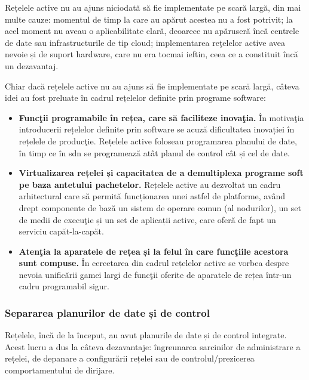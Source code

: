 Rețelele active nu au ajuns niciodată să fie implementate pe scară largă, din mai multe cauze: momentul de timp la care au apărut acestea nu a fost potrivit; la acel moment nu aveau o aplicabilitate clară, deoarece nu apăruseră încă centrele de date sau infrastructurile de tip cloud; implementarea reţelelor active avea nevoie și de suport hardware, care nu era tocmai ieftin, ceea ce a constituit încă un dezavantaj.

Chiar dacă rețelele active nu au ajuns să fie implementate pe scară largă, câteva idei au fost preluate în cadrul rețelelor definite prin programe software:
\begin{itemize}
\item \textbf{Funcţii programabile în rețea, care să faciliteze inovaţia.} În motivaţia introducerii rețelelor definite prin software se acuză dificultatea inovației în rețelele de producţie. Rețelele active foloseau programarea planului de date, în timp ce în \gls{sdn} se programează atât planul de control cât și cel de date.
\item \textbf{Virtualizarea rețelei și capacitatea de a demultiplexa programe soft pe baza antetului pachetelor.} Rețelele active au dezvoltat un cadru arhitectural care să permită funcționarea unei astfel de platforme, având drept componente de bază un sistem de operare comun (al nodurilor), un set de medii de execuţie și un set de aplicații active, care oferă de fapt un serviciu capăt-la-capăt.
\item \textbf{Atenţia la aparatele de rețea și la felul în care funcţiile acestora sunt compuse.} În cercetarea din cadrul rețelelor active se vorbea despre nevoia unificării gamei largi de funcţii oferite de aparatele de rețea într-un cadru programabil sigur.
\end{itemize}

\subsubsection{Separarea planurilor de date și de control}

Rețelele, încă de la început, au avut planurile de date și de control integrate. Acest lucru a dus la câteva dezavantaje: îngreunarea sarcinilor de administrare a rețelei, de depanare a configurării rețelei sau de controlul/prezicerea comportamentului de dirijare.

